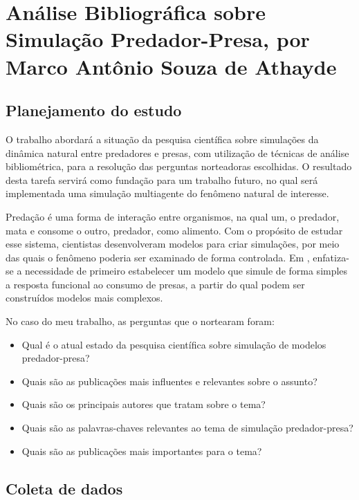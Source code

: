 \chapter{Análise Bibliográfica sobre Simulação Predador-Presa, por Marco Antônio Souza de Athayde\label{chap:bibliometria:masathayde}}

\section{Planejamento do estudo\label{PPS@masathayde:questoes}}
O trabalho abordará a situação da pesquisa científica sobre simulações da dinâmica natural entre predadores e presas, com utilização de técnicas de análise bibliométrica, para a resolução das perguntas norteadoras escolhidas. O resultado desta tarefa servirá como fundação para um trabalho futuro, no qual será implementada uma simulação multiagente do fenômeno natural de interesse.

Predação é uma forma de interação entre organismos, na qual um, o predador, mata e consome o outro, predador, como alimento. \cite{noauthor_predation_nodate} Com o propósito de estudar esse sistema, cientistas desenvolveram modelos para criar simulações, por meio das quais o fenômeno poderia ser examinado de forma controlada. Em \cite{holling_characteristics_1959}, enfatiza-se a necessidade de primeiro estabelecer um modelo que simule de forma simples a resposta funcional ao consumo de presas, a partir do qual podem ser construídos modelos mais complexos.

No caso do meu trabalho, as perguntas que o nortearam foram:
\begin{itemize}
    \item Qual é o atual estado da pesquisa científica sobre simulação de modelos predador-presa?
    \item Quais são as publicações mais influentes e relevantes sobre o assunto?
    \item Quais são os principais autores que tratam sobre o tema?
    \item Quais são as palavras-chaves relevantes ao tema de simulação predador-presa?
    \item Quais são as publicações mais importantes para o tema?
\end{itemize}

\section{Coleta de dados\label{PPS@masathayde:coleta}}

